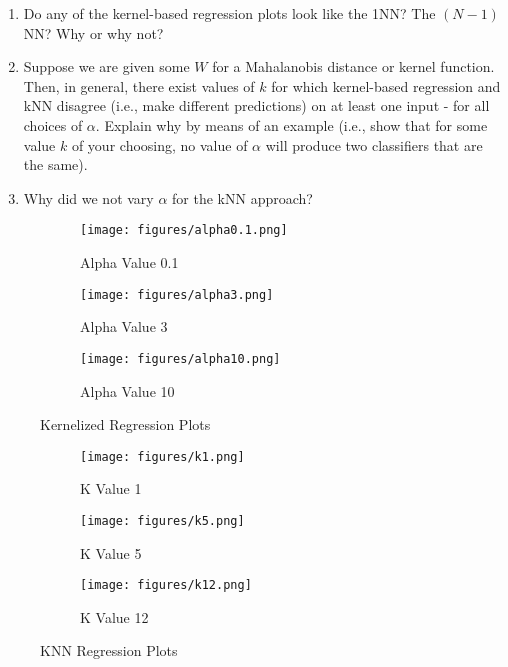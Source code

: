 \documentclass[submit]{harvardml}
\begin{document}
\begin{problem}
\begin{enumerate}
\item Do any of the kernel-based regression plots look like the 1NN?
  The $(N-1)$NN?  Why or why not?

\item Suppose we are given some $W$ for a Mahalanobis distance or
  kernel function.  Then, in general, there exist values of $k$ for which
  kernel-based regression and kNN disagree (i.e., make different predictions)
  on at least one input - for all choices of $\alpha$. Explain why by means of
  an example (i.e., show that for some value $k$ of your choosing,
  no value of $\alpha$ will produce two classifiers that are the same).
    
\item Why did we not vary $\alpha$ for the kNN approach?    

\end{enumerate}

\end{problem}

\newpage

\begin{figure}
\centering
\begin{subfigure}{0.33\textwidth}
  \centering
  \texttt{[image: figures/alpha0.1.png]}
  \caption{Alpha Value 0.1}
  \label{fig:sub1}
\end{subfigure}%
\begin{subfigure}{0.33\textwidth}
  \centering
  \texttt{[image: figures/alpha3.png]}
  \caption{Alpha Value 3}
  \label{fig:sub2}
\end{subfigure}
\begin{subfigure}{0.33\textwidth}
  \centering
  \texttt{[image: figures/alpha10.png]}
  \caption{Alpha Value 10}
  \label{fig:sub2}
\end{subfigure}
\caption{Kernelized Regression Plots}
\label{fig:test}
\end{figure}


\begin{figure}
\centering
\begin{subfigure}{0.33\textwidth}
  \centering
  \texttt{[image: figures/k1.png]}
  \caption{K Value 1}
  \label{fig:sub1}
\end{subfigure}%
\begin{subfigure}{0.33\textwidth}
  \centering
  \texttt{[image: figures/k5.png]}
  \caption{K Value 5}
  \label{fig:sub2}
\end{subfigure}
\begin{subfigure}{0.33\textwidth}
  \centering
  \texttt{[image: figures/k12.png]}
  \caption{K Value 12}
  \label{fig:sub2}
\end{subfigure}
\caption{KNN Regression Plots}
\label{fig:test}
\end{figure}
\end{document}
